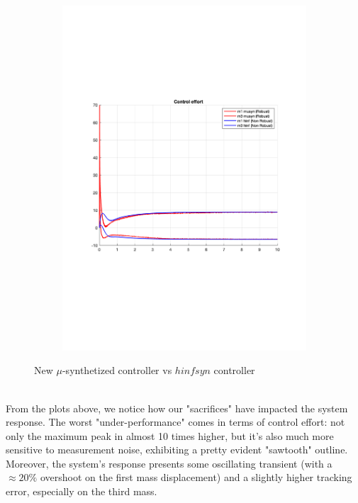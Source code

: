 \documentclass[a4paper, 12pt]{article}
\begin{document}
\begin{figure}[h!]{}
\begin{subfigure}[t]{0.45\textwidth}
           \label{fig:fig04a}
    \end{subfigure}
    \begin{subfigure}[t]{0.45\textwidth}
    \includegraphics[width=\textwidth]{Figures/fig04b.pdf}
           \label{fig:fig04b}
    \end{subfigure}
    \caption{New $\mu$-synthetized controller vs $hinfsyn$ controller}
    \label{fig:fig04}
   \end{figure}
\\From the plots above, we notice how our "sacrifices" have impacted the system response. The worst "under-performance" comes in terms of control effort: not only the maximum peak in almost 10 times higher, but it's also much more sensitive to measurement noise, exhibiting a pretty evident "sawtooth" outline. 
\\Moreover, the system's response presents some oscillating transient (with a $\approx20\%$ overshoot on the first mass displacement) and a slightly higher tracking error, especially on the third mass.
\end{document}
